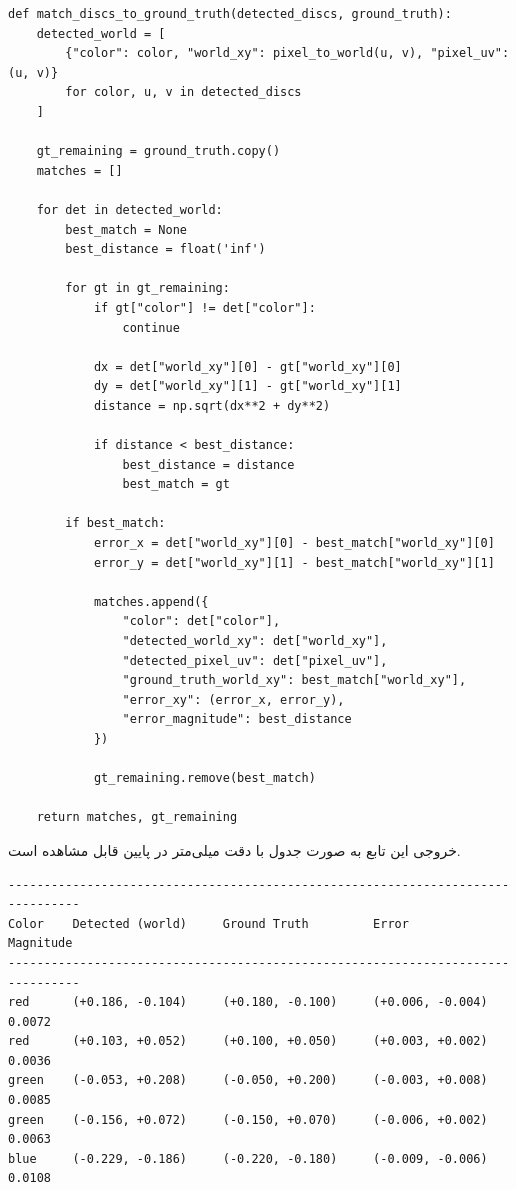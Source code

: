 \documentclass{article}
\begin{document}
\begin{latin}
\begin{LTR}
\begin{listing}[htbp]
\begin{verbatim}
def match_discs_to_ground_truth(detected_discs, ground_truth):
    detected_world = [
        {"color": color, "world_xy": pixel_to_world(u, v), "pixel_uv": (u, v)}
        for color, u, v in detected_discs
    ]
    
    gt_remaining = ground_truth.copy()
    matches = []
    
    for det in detected_world:
        best_match = None
        best_distance = float('inf')
        
        for gt in gt_remaining:
            if gt["color"] != det["color"]:
                continue
            
            dx = det["world_xy"][0] - gt["world_xy"][0]
            dy = det["world_xy"][1] - gt["world_xy"][1]
            distance = np.sqrt(dx**2 + dy**2)
            
            if distance < best_distance:
                best_distance = distance
                best_match = gt
        
        if best_match:
            error_x = det["world_xy"][0] - best_match["world_xy"][0]
            error_y = det["world_xy"][1] - best_match["world_xy"][1]
            
            matches.append({
                "color": det["color"],
                "detected_world_xy": det["world_xy"],
                "detected_pixel_uv": det["pixel_uv"],
                "ground_truth_world_xy": best_match["world_xy"],
                "error_xy": (error_x, error_y),
                "error_magnitude": best_distance
            })
            
            gt_remaining.remove(best_match)
    
    return matches, gt_remaining
\end{verbatim}
\end{listing}
\end{LTR}
\end{latin}

خروجی این تابع به صورت جدول با دقت میلی‌متر در پایین قابل مشاهده است.
\begin{latin}
\begin{LTR}
\begin{verbatim}
--------------------------------------------------------------------------------
Color    Detected (world)     Ground Truth         Error                Magnitude 
--------------------------------------------------------------------------------
red      (+0.186, -0.104)     (+0.180, -0.100)     (+0.006, -0.004)     0.0072    
red      (+0.103, +0.052)     (+0.100, +0.050)     (+0.003, +0.002)     0.0036    
green    (-0.053, +0.208)     (-0.050, +0.200)     (-0.003, +0.008)     0.0085    
green    (-0.156, +0.072)     (-0.150, +0.070)     (-0.006, +0.002)     0.0063    
blue     (-0.229, -0.186)     (-0.220, -0.180)     (-0.009, -0.006)     0.0108    
\end{verbatim}
\end{LTR}
\end{latin}
\end{document}
